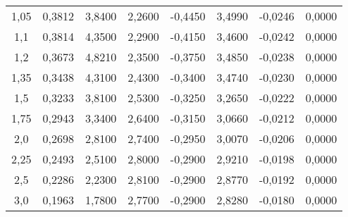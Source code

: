 \begin{table}[ht]
\begin{tabular}{c|c|c|c|c|c|c|c}
1,05  & 0,3812  & 3,8400 & 2,2600 & -0,4450 & 3,4990 & -0,0246 & 0,0000 \\
1,1   & 0,3814  & 4,3500 & 2,2900 & -0,4150 & 3,4600 & -0,0242 & 0,0000 \\
1,2   & 0,3673  & 4,8210 & 2,3500 & -0,3750 & 3,4850 & -0,0238 & 0,0000 \\
1,35  & 0,3438  & 4,3100 & 2,4300 & -0,3400 & 3,4740 & -0,0230 & 0,0000 \\
1,5   & 0,3233  & 3,8100 & 2,5300 & -0,3250 & 3,2650 & -0,0222 & 0,0000 \\
1,75  & 0,2943  & 3,3400 & 2,6400 & -0,3150 & 3,0660 & -0,0212 & 0,0000 \\
2,0   & 0,2698  & 2,8100 & 2,7400 & -0,2950 & 3,0070 & -0,0206 & 0,0000 \\
2,25  & 0,2493  & 2,5100 & 2,8000 & -0,2900 & 2,9210 & -0,0198 & 0,0000 \\
2,5   & 0,2286  & 2,2300 & 2,8100 & -0,2900 & 2,8770 & -0,0192 & 0,0000 \\
3,0   & 0,1963  & 1,7800 & 2,7700 & -0,2900 & 2,8280 & -0,0180 & 0,0000
\end{tabular}
\label{tab:apendice-coeficientes-combasebleed-1500K}
\end{table}